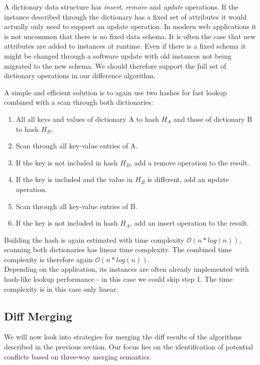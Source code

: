 A dictionary data structure has \emph{insert}, \emph{remove} and \emph{update} operations.
If the instance described through the dictionary has a fixed set of attributes it would actually only need to support an update operation.
In modern web applications it is not uncommon that there is no fixed data schema.
It is often the case that new attributes are added to instances at runtime.
Even if there is a fixed schema it might be changed through a software update with old instances not being migrated to the new schema.
We should therefore support the full set of dictionary operations in our difference algorithm.

A simple and efficient solution is to again use two hashes for fast lookup combined with a scan through both dictionaries:

\begin{enumerate}
\item All all keys and values of dictionary A to hash $ H_A $ and those of dictionary B to hash $ H_B $.
\item Scan through all key-value entries of A.
\item If the key is not included in hash $ H_B $, add a remove operation to the result.
\item If the key is included and the value in $ H_B $ is different, add an update operation.
\item Scan through all key-value entries of B.
\item If the key is not included in hash $ H_A $, add an insert operation to the result.
\end{enumerate}

Building the hash is again estimated with time complexity $ \mathcal O(n * log(n)) $, scanning both dictionaries has linear time complexity. The combined time complexity is therefore again $ \mathcal O(n * log(n)) $.\\
Depending on the application, its instances are often already implemented with hash-like lookup performance - in this case we could skip step 1.
The time complexity is in this case only linear.\\

\subsection{Diff Merging}
\label{sec:histo.merging.merge}

We will now look into strategies for merging the diff results of the algorithms described in the previous section.
Our focus lies on the identification of potential conflicts based on three-way merging semantics.\\

